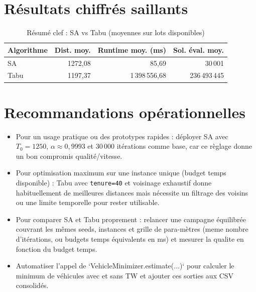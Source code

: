 \section*{Résultats chiffrés saillants}
\begin{table}[H]
\centering
\caption{Résumé clef : SA vs Tabu (moyennes sur lots disponibles)}
\begin{tabular}{lrrr}
\toprule
Algorithme & Dist. moy. & Runtime moy. (ms) & Sol. éval. moy. \\
\midrule
SA & 1272,08 & 85,69 & 30\,001 \\
Tabu & 1197,37 & 1\,398\,556,68 & 236\,493\,445 \\
\bottomrule
\end{tabular}
\end{table}

\section*{Recommandations opérationnelles}
\begin{itemize}[leftmargin=1.2cm]
  \item Pour un usage pratique ou des prototypes rapides : déployer SA avec $T_0=1250$, $\alpha\approx0{,}9993$ et 30\,000 itérations comme base, car ce règlage donne un bon compromis qualité/vitesse.
  \item Pour optimisation maximum sur une instance unique (budget temps disponible) : Tabu avec \texttt{tenure=40} et voisinage exhaustif donne habituellement de meilleures distances mais nécessite un filtrage des voisins ou une limite temporelle pour rester utilisable.
  \item Pour comparer SA et Tabu proprement : relancer une campagne équilibrée couvrant les mêmes seeds, instances et grille de para-mètres (meme nombre d'itérations, ou budgets temps équivalents en ms) et mesurer la qualite en fonction du budget temps.
  \item Automatiser l'appel de `VehicleMinimizer.estimate(...)` pour calculer le minimum de véhicules avec et sans TW et ajouter ces sorties aux CSV consolidés.
\end{itemize}

